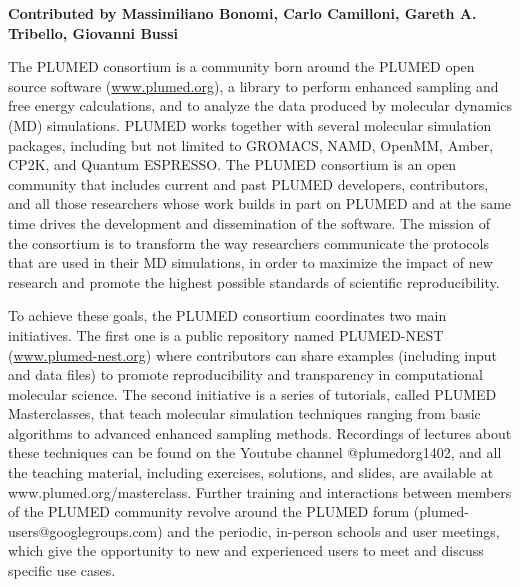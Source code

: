 \textbf{Contributed by Massimiliano Bonomi, Carlo Camilloni, Gareth A. Tribello, Giovanni Bussi}

The PLUMED consortium\cite{plumed2019promoting} is a community born around the PLUMED open source software (\href{https://www.plumed.org}{www.plumed.org})\cite{tribello2014plumed}, a library to perform enhanced sampling and free energy calculations, and to analyze the data produced by molecular dynamics (MD) simulations. PLUMED works together with several molecular simulation packages, including but not limited to GROMACS, NAMD, OpenMM, Amber, CP2K, and Quantum ESPRESSO. The PLUMED consortium  is an open community that includes current and past PLUMED developers, contributors, and all those researchers whose work builds in part on PLUMED and at the same time drives the development and dissemination of the software. The mission of the consortium is to transform the way researchers communicate the protocols that are used in their MD simulations, in order to maximize the impact of new research and promote the highest possible standards of scientific reproducibility. 

To achieve these goals, the PLUMED consortium coordinates two main initiatives. The first one is a public repository named PLUMED-NEST (\href{https://www.plumed-nest.org}{www.plumed-nest.org}) where contributors can share examples (including input and data files) to promote reproducibility and transparency in computational molecular science. The second initiative is a series of tutorials, called PLUMED Masterclasses, that teach molecular simulation techniques ranging from basic algorithms to advanced enhanced sampling methods. Recordings of lectures about these techniques can be found on the Youtube channel @plumedorg1402, and all the teaching material, including exercises, solutions, and slides, are available at www.plumed.org/masterclass. Further training and interactions between members of the PLUMED community revolve around the PLUMED forum (plumed-users@googlegroups.com) and the periodic, in-person schools and user meetings, which give the opportunity to new and experienced users to meet and discuss specific use cases.